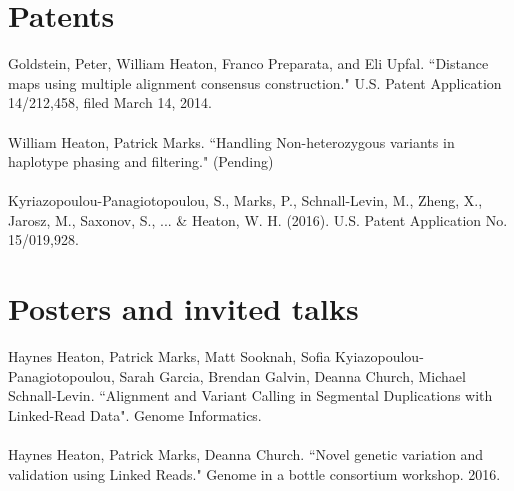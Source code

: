\documentclass[margin]{res}
\begin{document}
\begin{resume}
\section{Patents}
Goldstein, Peter, William Heaton, Franco Preparata, and Eli Upfal. ``Distance maps using multiple alignment consensus construction." U.S. Patent Application 14/212,458, filed March 14, 2014. \\  \\
William Heaton, Patrick Marks. ``Handling Non-heterozygous variants in haplotype phasing and filtering." (Pending) \\ \\
Kyriazopoulou-Panagiotopoulou, S., Marks, P., Schnall-Levin, M., Zheng, X., Jarosz, M., Saxonov, S., ... \& Heaton, W. H. (2016). U.S. Patent Application No. 15/019,928. 


\section{Posters and invited talks}

Haynes Heaton, Patrick Marks, Matt Sooknah, Sofia Kyiazopoulou-Panagiotopoulou, Sarah Garcia, Brendan Galvin, Deanna Church, Michael Schnall-Levin. ``Alignment and Variant Calling in Segmental Duplications with Linked-Read Data". Genome Informatics. \\ \\
Haynes Heaton, Patrick Marks, Deanna Church. ``Novel genetic variation and validation using Linked Reads." Genome in a bottle consortium workshop. 2016.


\end{resume} 
\end{document}
